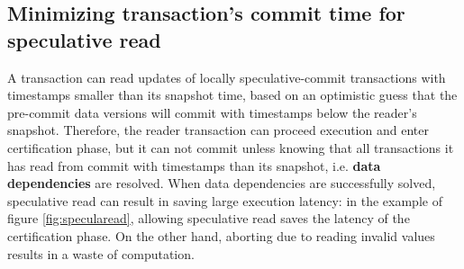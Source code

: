 \subsection{Minimizing transaction's commit time for speculative read}
\label{sub:pc}
A transaction can read updates of locally speculative-commit transactions with timestamps smaller than its snapshot time, based on an optimistic guess that the pre-commit data versions will commit with timestamps below the reader's snapshot. Therefore, the reader transaction can proceed execution and enter certification phase, but it can not commit unless knowing that all transactions it has read from commit with timestamps than its snapshot, i.e. \textbf{data dependencies} are resolved. When data dependencies are successfully solved, speculative read can result in saving large execution latency: in the example of figure \ref{fig:specularead}, allowing speculative read saves the latency of the certification phase. On the other hand, aborting due to reading invalid values results in a waste of computation. 

